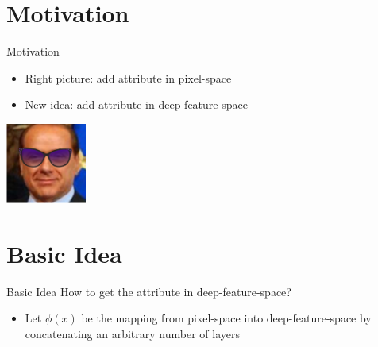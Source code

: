 \documentclass[11pt]{beamer}
\begin{document}
\addtocounter{framenumber}{-1} %




\begin{frame}[allowframebreaks]
	\tableofcontents
\end{frame}%

\section{Motivation}



\begin{frame}{Motivation}
		\begin{minipage}{.5\textwidth}
			\centering
			\begin{itemize}
				\item<1-> Right picture: add attribute in pixel-space
				\item<2-> New idea: add attribute in deep-feature-space
			\end{itemize}
		\end{minipage}%
		\begin{minipage}{.5\textwidth}
			\centering
			\includegraphics[width=100px]{../pictures/Berlusconi.png}		
		\end{minipage}
\end{frame}

\section{Basic Idea}

\begin{frame}{Basic Idea}
	How to get the attribute in deep-feature-space?
	\pause
	\begin{itemize}
		\item Let $\phi(x)$ be the mapping from pixel-space into deep-feature-space by concatenating an arbitrary number of layers
		\begin{center}
			\pause
				
		\end{center}
	\end{itemize}
\end{frame}
\end{document}
